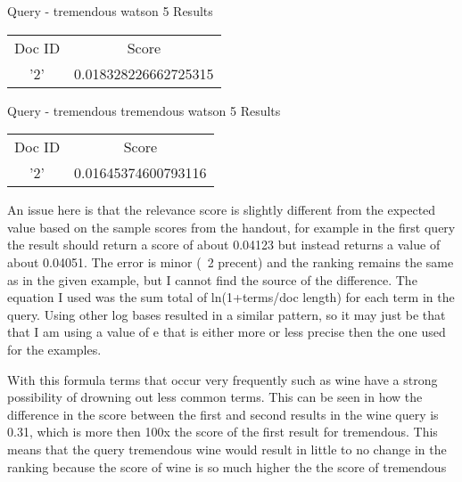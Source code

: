 \documentclass[12pt, letterpaper]{article}
\begin{document}
\begin{center}
Query -  tremendous watson 5\newline
Results\newline
\newline
\begin{tabular}{c|c}
	Doc ID & Score \\
	'2'& 0.018328226662725315 \\
\end{tabular}

Query -  tremendous tremendous watson 5\newline
Results	\newline\newline
\begin{tabular}{c|c}
	Doc ID & Score \\
	'2'& 0.01645374600793116 \\
\end{tabular}
\end{center}

An issue here is that the relevance score is slightly different from the expected value based on the sample scores from the handout, for example in the first query the result should return a score of about 0.04123 but instead returns a value of about 0.04051. The error is minor (~2 precent) and the ranking remains the same as in the given example, but I cannot find the source of the difference. The equation I used was the sum total of ln(1+terms/doc length) for each term in the query. Using other log bases resulted in a similar pattern, so it may just be that that I am using a value of e that is either more or less precise then the one used for the examples.

With this formula terms that occur very frequently such as wine have a strong possibility of drowning out less common terms. This can be seen in how the difference in the score between the first and second results in the wine query is 0.31, which is more then 100x the score of the first result for tremendous. This means that the query tremendous wine would result in little to no change in the ranking because the score of wine is so much higher the the score of tremendous
\end{document}
